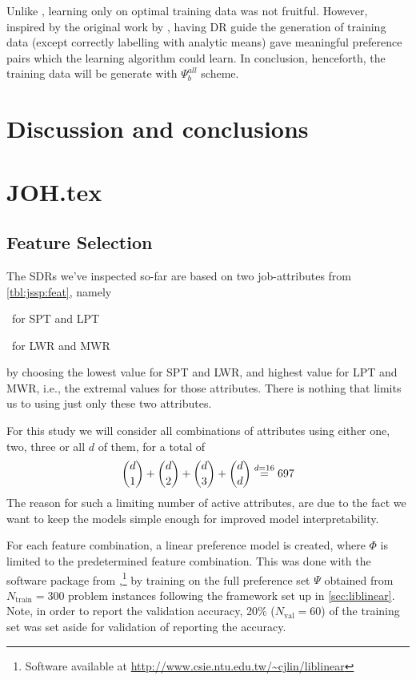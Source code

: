 Unlike \citep{Siggi10,Malik08,Russell09}, learning only on optimal training 
data was not fruitful. However, inspired by the original work by 
\cite{Siggi05}, having DR guide the generation of training data (except 
correctly labelling with analytic means) gave meaningful preference pairs which 
the learning algorithm could learn. In conclusion, henceforth, the training 
data will be generate with $\Psi_{ b}^{all}$ scheme.






\section{Discussion and conclusions}



\section{JOH.tex}

\subsection{Feature Selection}
The SDRs we've inspected so-far are based on two job-attributes from
\cref{tbl:jssp:feat}, namely
\begin{enumerate*}[after={{,}}]
  \item \phiproc\ for SPT and LPT 
  \item \phijobWrm\ for LWR and MWR 
\end{enumerate*}
by choosing the lowest value for SPT and LWR, and highest value for LPT and 
MWR, i.e., the extremal values for those attributes. 
There is nothing that limits us to using just only these two attributes. 

For this study we will consider all combinations of attributes using either one,
two, three or all $d$ of them, for a total of
\begin{equation}
{d \choose 1}+{d \choose 2}+{d \choose 3}+{d \choose d} 
\stackrel{d=16}{=} 697
\end{equation}
The reason for such a limiting number of active attributes,
are due to the fact we want to keep the models simple enough for improved model
interpretability.

For each feature combination, a linear preference model is created, where 
$\Phi$ is limited to the predetermined feature combination. 
This was done with the software package from
\cite{liblinear},\footnote{Software available at
  \url{http://www.csie.ntu.edu.tw/~cjlin/liblinear}}
by training on the full preference set $\Psi$ obtained from 
\mbox{$N_{\text{train}}=300$} problem instances following the framework set up 
in \cref{sec:liblinear}. 
Note, in order to report the validation accuracy, 20\% ($N_{\text{val}}=60$) of 
the training set was set aside for validation of reporting the accuracy.


